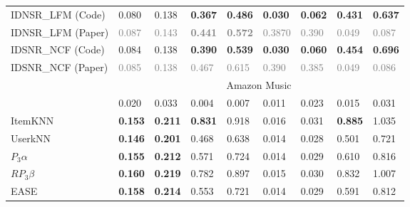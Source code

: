 \documentclass[sigconf,natbib=true,nonacm]{acmart}
\begin{document}
\begin{table}[htbp]
\begin{tabular}{l l l l l l l l l}
        IDNSR\_LFM   (Code)      & 0.080          & 0.138           & \textbf{0.367}  & \textbf{0.486}  & \textbf{0.030} & \textbf{0.062}    & \textbf{0.431}    & \textbf{0.637} \\
        IDNSR\_LFM  (Paper)      & \textcolor{gray}{0.087}          & \textcolor{gray}{0.143}     & \textcolor{gray}{\textbf{0.441}}   & \textcolor{gray}{\textbf{ 0.572}}  & \textcolor{gray}{0.3870} & \textcolor{gray}{0.390}          & \textcolor{gray}{0.049}        & \textcolor{gray}{0.087} \\
        IDSNR\_NCF   (Code)      & 0.084          & 0.138           & \textbf{0.390}  & \textbf{0.539 } & \textbf{0.030} & \textbf{0.060}    & \textbf{0.454}     & \textbf{0.696} \\
        IDSNR\_NCF  (Paper)      & \textcolor{gray}{0.085}          & \textcolor{gray}{0.138}        & \textcolor{gray}{0.467}         & \textcolor{gray}{0.615}           & \textcolor{gray}{0.390}  & \textcolor{gray}{ 0.385}          & \textcolor{gray}{0.049}            & \textcolor{gray}{0.086} \\


        \multirow{2}{*}{} & \multicolumn{8}{c}{Amazon Music} \\ \hline
        TopPop                  & 0.020          & 0.033          & 0.004          & 0.007          & 0.011          & 0.023          & 0.015          & 0.031 \\
        ItemKNN                 & \textbf{0.153} & \textbf{0.211} & \textbf{0.831} & 0.918          & 0.016          & 0.031          & \textbf{0.885} & 1.035 \\
        UserkNN                 & \textbf{0.146} & \textbf{0.201} & 0.468          & 0.638          & 0.014          & 0.028          & 0.501          & 0.721 \\
        $P_{3}\alpha$           & \textbf{0.155} & \textbf{0.212} & 0.571          & 0.724          & 0.014          & 0.029          & 0.610          & 0.816 \\
        $RP_{3}\beta$           & \textbf{0.160} & \textbf{0.219} & 0.782          & 0.897          & 0.015          & 0.030          & 0.832          & 1.007 \\
        EASE                    & \textbf{0.158} & \textbf{0.214} & 0.553          & 0.721          & 0.014          & 0.029          & 0.591          & 0.812 \\ \hline


\end{tabular}
\end{table}
\end{document}
